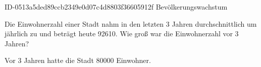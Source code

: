 \begin{exercise}
      {ID-0513a5ded89ccb2349e0d07c4d8803f36605912f}
      {Bevölkerungswachstum}
  \ifproblem\problem\par
    Die Einwohnerzahl einer Stadt nahm in den letzten 3 Jahren
    durchschnittlich um  jährlich zu und beträgt heute \num{92610}.
    Wie groß war die Einwohnerzahl vor 3 Jahren?
  \fi
  \ifoutcome\outcome\par
    Vor 3 Jahren hatte die Stadt \num{80000} Einwohner.
  \fi
\end{exercise}
